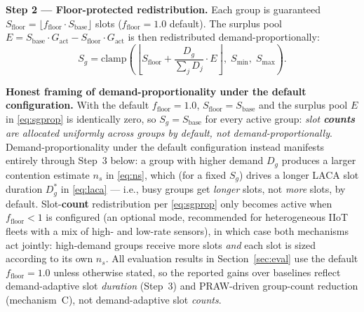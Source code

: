 \documentclass[journal]{IEEEtran}
\begin{document}
\textbf{Step 2 --- Floor-protected redistribution.}
Each group is guaranteed $S_\mathrm{floor}\!=\!\lfloor
f_\mathrm{floor}\cdot S_\mathrm{base}\rfloor$ slots
($f_\mathrm{floor}\!=\!1.0$ default).
The surplus pool $E\!=\!S_\mathrm{base}\cdot G_\mathrm{act} -
S_\mathrm{floor}\cdot G_\mathrm{act}$ is then redistributed
demand-proportionally:
\begin{equation}
  S_g = \mathrm{clamp}\!\left(\left\lfloor S_\mathrm{floor} +
    \frac{D_g}{\sum_{j}D_j}\cdot E \right\rfloor,\;
    S_\mathrm{min},\; S_\mathrm{max}\right).
  \label{eq:sgprop}
\end{equation}

\textbf{Honest framing of demand-proportionality under the default
configuration.}
With the default $f_\mathrm{floor}\!=\!1.0$,
$S_\mathrm{floor}\!=\!S_\mathrm{base}$ and the surplus pool
$E$ in \eqref{eq:sgprop} is identically zero, so $S_g\!=\!S_\mathrm{base}$
for every active group: \emph{slot \textbf{counts} are allocated
uniformly across groups by default, not demand-proportionally}.
Demand-proportionality under the default configuration instead
manifests entirely through Step~3 below: a group with higher demand
$D_g$ produces a larger contention estimate $n_s$ in \eqref{eq:ns},
which (for a fixed $S_g$) drives a longer LACA slot duration $D_g^*$
in \eqref{eq:laca} --- i.e., busy groups get \emph{longer} slots, not
\emph{more} slots, by default.
Slot-\textbf{count} redistribution per \eqref{eq:sgprop} only becomes
active when $f_\mathrm{floor}\!<\!1$ is configured (an optional mode,
recommended for heterogeneous IIoT fleets with a mix of high- and
low-rate sensors), in which case both mechanisms act jointly:
high-demand groups receive more slots \emph{and} each slot is sized
according to its own $n_s$.
All evaluation results in Section~\ref{sec:eval} use the default
$f_\mathrm{floor}\!=\!1.0$ unless otherwise stated, so the reported
gains over baselines reflect demand-adaptive slot \emph{duration}
(Step~3) and PRAW-driven group-count reduction (mechanism~C), not
demand-adaptive slot \emph{counts}.
\end{document}
